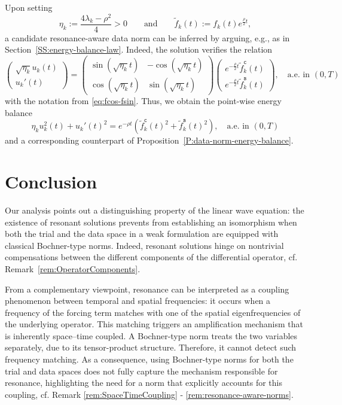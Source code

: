 \documentclass{amsart}
\theoremstyle{plain}
\theoremstyle{remark}
\numberwithin{equation}{section}
\numberwithin{theorem}{section}
\newcommand{\ftsin}{\widetilde f_{k}^{\mathtt{s}}}
\newcommand{\ftcos}{\widetilde f_{k}^{\mathtt{c}}}
\begin{document}
Upon setting
\[
\eta_k := \frac{4\lambda_k - \rho^2}{4} > 0 
\qquad \text{and} \qquad
\widetilde{f}_k(t) := f_k(t)e^{\frac{\rho}{2} t}, 
\]
a candidate resonance-aware data norm can be inferred by arguing, e.g., as in Section~\ref{SS:energy-balance-law}. Indeed, the solution verifies the relation
\[
\begin{pmatrix}
	\sqrt{\eta_k} u_k(t) \\[3pt] 
	u_k'(t)
\end{pmatrix} 
= 
\begin{pmatrix}
	\sin(\sqrt{\eta_k} t) & -\cos(\sqrt{\eta_k} t) \\[3pt] 
	\cos(\sqrt{\eta_k} t) & \sin(\sqrt{\eta_k} t)
\end{pmatrix}
\begin{pmatrix}
	e^{-\frac{\rho}{2} t}\ftcos(t) \\[3pt]
	e^{-\frac{\rho}{2} t} \ftsin(t)
\end{pmatrix}, \quad \text{a.e. in $(0,T)$}
\]
with the notation from \eqref{eq:fcos-fsin}. Thus, we obtain the point-wise energy balance 
\[
\eta_k u_k^2(t) + u_k'(t)^2 = e^{-\rho t}\left( \ftcos(t)^2+ \ftsin(t)^2\right), \quad \text{a.e. in $(0,T)$}
\]
and a corresponding counterpart of Proposition~\ref{P:data-norm-energy-balance}.

\section{Conclusion}
Our analysis points out a distinguishing property of the linear wave equation: the existence of resonant solutions prevents from establishing an isomorphism when both the trial and the data space in a weak formulation are equipped with classical Bochner-type norms. Indeed, resonant solutions hinge on nontrivial compensations between the different components of the differential operator, cf. Remark~\ref{rem:OperatorComponents}.

From a complementary viewpoint, resonance can be interpreted as a coupling phenomenon between temporal and spatial frequencies: it occurs when a  frequency of the forcing term matches with one of the spatial eigenfrequencies of the underlying operator. This matching triggers an amplification mechanism that is inherently space–time coupled. A Bochner-type norm treats the two variables separately, due to its tensor-product structure. Therefore, it cannot detect such frequency matching. As a consequence, using Bochner-type norms for both the trial and data spaces does not fully capture the mechanism responsible for resonance, highlighting the need for a norm that explicitly accounts for this coupling, cf. Remark \ref{rem:SpaceTimeCoupling} - \ref{rem:resonance-aware-norms}.
\end{document}
